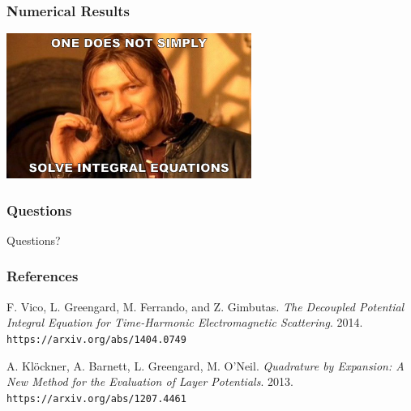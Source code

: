 \documentclass{beamer}
\begin{document}
	\begin{frame}
	\frametitle{Numerical Results}
	\hfil\hfil\includegraphics[width=8cm,frame]{notSimplySolveIE}\hfil\hfil
	\end{frame}


	\begin{frame}
	\frametitle{Questions}
	\begin{center}
		Questions?
	\end{center}
	\end{frame}


	\begin{frame}
	\frametitle{References}
	\begin{thebibliography}{9}
		\bibitem{dpie} 
		F. Vico, L. Greengard, M. Ferrando, and Z. Gimbutas. 
		\textit{The Decoupled Potential Integral Equation for Time-Harmonic Electromagnetic Scattering}. 
		2014. \\\texttt{https://arxiv.org/abs/1404.0749}
		
		\bibitem{qbx} 
		A. Klöckner, A. Barnett, L. Greengard, M. O'Neil.
		\textit{Quadrature by Expansion: A New Method for the Evaluation of Layer Potentials}.
		2013. \\\texttt{https://arxiv.org/abs/1207.4461}
		
	\end{thebibliography}
	\end{frame}
\end{document}
